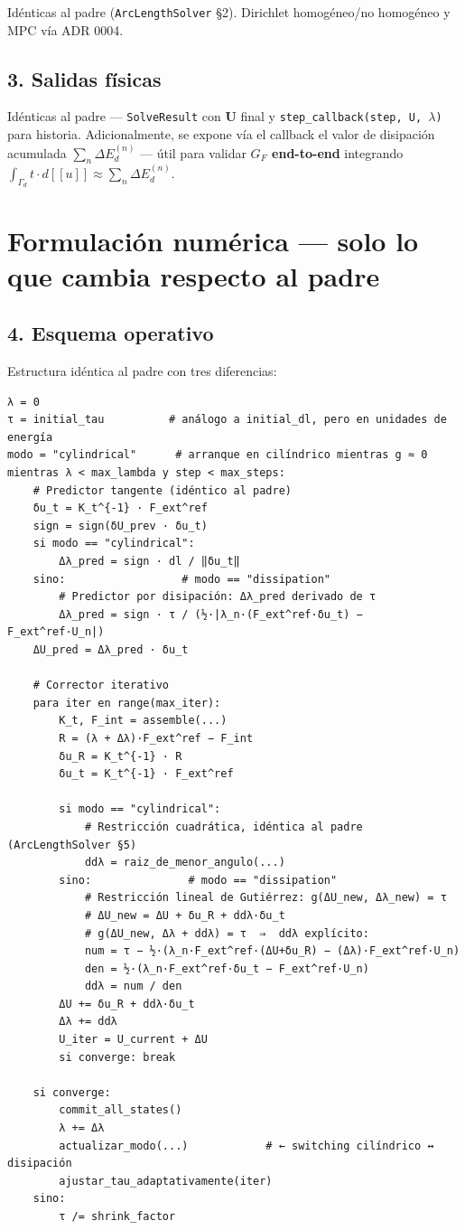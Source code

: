\documentclass[11pt,letterpaper,oneside]{report}
\begin{document}
Idénticas al padre (\texttt{ArcLengthSolver} §2). Dirichlet homogéneo/no homogéneo y MPC vía ADR 0004.

\subsection{3. Salidas físicas}

Idénticas al padre --- \texttt{SolveResult} con $\mathbf U$ final y \texttt{step\_callback(step, U, \ensuremath{\lambda})} para historia. Adicionalmente, se expone vía el callback el valor de disipación acumulada $\sum_n \Delta E_d^{(n)}$ --- útil para validar \textbf{$G_F$ end-to-end} integrando $\int_{\Gamma_d} t\cdot d[\![u]\!] \approx \sum_n \Delta E_d^{(n)}$.


\section{Formulación numérica --- solo lo que cambia respecto al padre}

\subsection{4. Esquema operativo}

Estructura idéntica al padre con tres diferencias:

\begin{lstlisting}
λ = 0
τ = initial_tau          # análogo a initial_dl, pero en unidades de energía
modo = "cylindrical"      # arranque en cilíndrico mientras g ≈ 0
mientras λ < max_lambda y step < max_steps:
    # Predictor tangente (idéntico al padre)
    δu_t = K_t^{-1} · F_ext^ref
    sign = sign(δU_prev · δu_t)
    si modo == "cylindrical":
        Δλ_pred = sign · dl / ‖δu_t‖
    sino:                  # modo == "dissipation"
        # Predictor por disipación: Δλ_pred derivado de τ
        Δλ_pred = sign · τ / (½·|λ_n·(F_ext^ref·δu_t) − F_ext^ref·U_n|)
    ΔU_pred = Δλ_pred · δu_t

    # Corrector iterativo
    para iter en range(max_iter):
        K_t, F_int = assemble(...)
        R = (λ + Δλ)·F_ext^ref − F_int
        δu_R = K_t^{-1} · R
        δu_t = K_t^{-1} · F_ext^ref

        si modo == "cylindrical":
            # Restricción cuadrática, idéntica al padre (ArcLengthSolver §5)
            ddλ = raiz_de_menor_angulo(...)
        sino:               # modo == "dissipation"
            # Restricción lineal de Gutiérrez: g(ΔU_new, Δλ_new) = τ
            # ΔU_new = ΔU + δu_R + ddλ·δu_t
            # g(ΔU_new, Δλ + ddλ) = τ  ⇒  ddλ explícito:
            num = τ − ½·(λ_n·F_ext^ref·(ΔU+δu_R) − (Δλ)·F_ext^ref·U_n)
            den = ½·(λ_n·F_ext^ref·δu_t − F_ext^ref·U_n)
            ddλ = num / den
        ΔU += δu_R + ddλ·δu_t
        Δλ += ddλ
        U_iter = U_current + ΔU
        si converge: break

    si converge:
        commit_all_states()
        λ += Δλ
        actualizar_modo(...)            # ← switching cilíndrico ↔ disipación
        ajustar_tau_adaptativamente(iter)
    sino:
        τ /= shrink_factor

\end{lstlisting}
\end{document}
